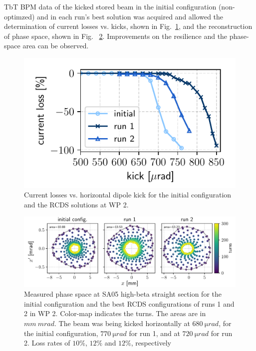 TbT BPM data of the kicked stored beam  in the initial configuration (non-optimzed) and in each run's best solution was acquired and allowed the determination of current losses vs. kicks, shown in Fig.~\ref{fig:loss_kicks_newtunes}, and the reconstruction of phase space, shown in Fig. ~\ref{fig:newtunes_phase}. Improvements on the resilience and the phase-space area can be observed.
\begin{figure}
    \centering
    \includegraphics[width=0.7\columnwidth]{Images/WEPL087_f3.pdf}
    \caption[Current losses vs. horizontal dipole kick for the initial configuration and the RCDS solutions at WP 2.]{Current losses vs. horizontal dipole kick for the initial configuration and the RCDS solutions at WP 2.}
    \label{fig:loss_kicks_newtunes}
\end{figure}
\begin{figure}[tb]
    \includegraphics[width=\textwidth]{Images/WEPL087_f4.pdf}
    \caption[Measured phase space at SA05 high-beta straight section for the initial configuration and the best RCDS configurations of runs 1 and 2 in WP 2.]{Measured phase space at SA05 high-beta straight section for the initial configuration and the best RCDS configurations of runs 1 and 2 in WP 2. Color-map indicates the turns. The areas are in $\unit{mm}~\unit{mrad}$. The beam was being kicked horizontally at $680~\unit{\micro rad}$, for the initial configuration, $770~\unit{\micro rad}$ for run 1, and at $720~\unit{\micro rad}$ for run 2. Loss rates of $10\%$, $12\%$ and $12\%$, respectively}
    \label{fig:newtunes_phase}
\end{figure}

